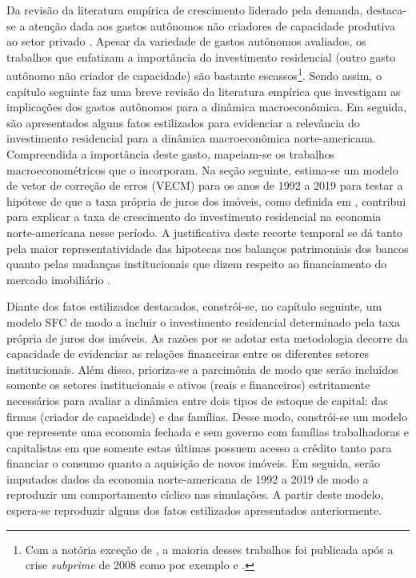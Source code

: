 Da revisão da literatura empírica de crescimento liderado pela demanda, destaca-se a atenção dada aos gastos autônomos não criadores de capacidade produtiva ao setor privado \cites{girardi_long-run_2016}{girardi_autonomous_2018}{freitas_pattern_2013}{braga_investment_2018}. Apesar da variedade de gastos autônomos avaliados, os trabalhos que enfatizam a importância do investimento residencial (outro gasto autônomo não criador de capacidade) são bastante escassos\footnote{Com a notória exceção de \textcite{leamer_housing_2007}, a maioria desses trabalhos foi publicada após a crise \textit{subprime} de 2008 como por exemplo \textcite{jorda_great_2014} e \textcite{fiebiger_semi-autonomous_2018}.}. 
Sendo assim, o capítulo seguinte faz uma breve revisão da literatura empírica que investigam as implicações dos gastos autônomos para a dinâmica macroeconômica.
Em seguida, são apresentados alguns fatos estilizados para evidenciar a relevância do investimento residencial para a dinâmica macroeconômica norte-americana.
Compreendida a importância deste gasto, mapeiam-se os trabalhos macroeconométricos que o incorporam.
Na seção seguinte, estima-se um modelo de vetor de correção de erros (VECM) para os anos de 1992 a 2019 para testar a hipótese de que  a taxa própria de juros dos imóveis, como definida em \textcite{teixeira_crescimento_2015}, 
contribui para explicar a taxa de crescimento do investimento residencial na economia norte-americana nesse período. 
A justificativa deste recorte temporal se dá tanto pela maior representatividade das hipotecas nos balanços patrimoniais dos bancos \cite{jorda_great_2014} quanto pelas mudanças institucionais que dizem respeito ao financiamento do mercado imobiliário \cites{federal_deposit_insurance_corporation_savings_1997}{mishkin_evaluating_1997}{wall_too_2010}.


Diante dos fatos estilizados destacados, constrói-se, no capítulo seguinte, um modelo SFC de modo a incluir o investimento residencial determinado pela taxa própria de juros dos imóveis. 
As razões por se adotar esta metodologia decorre da capacidade de evidenciar as relações financeiras entre os diferentes setores institucionais. 
Além disso, prioriza-se a parcimônia de modo que serão incluídos somente os setores institucionais e ativos (reais e financeiros) estritamente necessários para avaliar a dinâmica entre dois tipos de estoque de capital: das firmas (criador de capacidade) e das famílias. 
Desse modo, constrói-se um modelo que represente uma economia fechada e sem governo
com famílias trabalhadoras e capitalistas em que somente estas últimas possuem acesso a crédito tanto para financiar o consumo quanto a aquisição de novos imóveis.
Em seguida, serão imputados dados da economia norte-americana de 1992 a 2019 de modo a reproduzir um comportamento cíclico nas simulações.
A partir deste modelo, espera-se reproduzir alguns dos fatos estilizados apresentados anteriormente.

